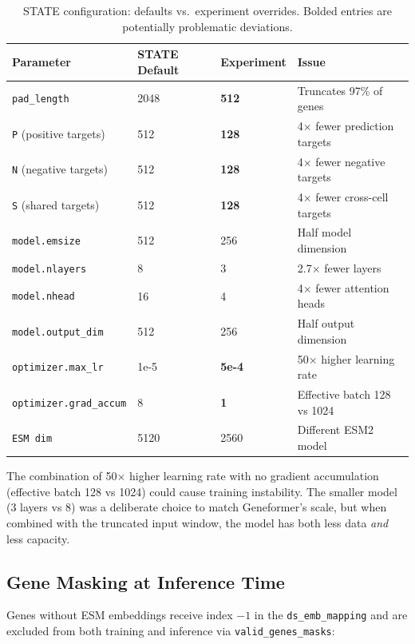 \documentclass[11pt,a4paper]{article}
\begin{document}
\begin{table}[H]
\centering
\caption{STATE configuration: defaults vs.\ experiment overrides. Bolded entries are potentially problematic deviations.}
\label{tab:config_diff}
\begin{tabular}{llll}
\toprule
Parameter & STATE Default & Experiment & Issue \\
\midrule
\texttt{pad\_length} & 2048 & \textbf{512} & Truncates 97\% of genes \\
\texttt{P} (positive targets) & 512 & \textbf{128} & 4$\times$ fewer prediction targets \\
\texttt{N} (negative targets) & 512 & \textbf{128} & 4$\times$ fewer negative targets \\
\texttt{S} (shared targets) & 512 & \textbf{128} & 4$\times$ fewer cross-cell targets \\
\texttt{model.emsize} & 512 & 256 & Half model dimension \\
\texttt{model.nlayers} & 8 & 3 & 2.7$\times$ fewer layers \\
\texttt{model.nhead} & 16 & 4 & 4$\times$ fewer attention heads \\
\texttt{model.output\_dim} & 512 & 256 & Half output dimension \\
\texttt{optimizer.max\_lr} & 1e-5 & \textbf{5e-4} & 50$\times$ higher learning rate \\
\texttt{optimizer.grad\_accum} & 8 & \textbf{1} & Effective batch 128 vs 1024 \\
\texttt{ESM dim} & 5120 & 2560 & Different ESM2 model \\
\bottomrule
\end{tabular}
\end{table}

\noindent The combination of 50$\times$ higher learning rate with no gradient accumulation (effective batch 128 vs 1024) could cause training instability. The smaller model (3 layers vs 8) was a deliberate choice to match Geneformer's scale, but when combined with the truncated input window, the model has both less data \emph{and} less capacity.

\subsection{Gene Masking at Inference Time}

Genes without ESM embeddings receive index $-1$ in the \texttt{ds\_emb\_mapping} and are excluded from both training and inference via \texttt{valid\_genes\_masks}:
\end{document}

